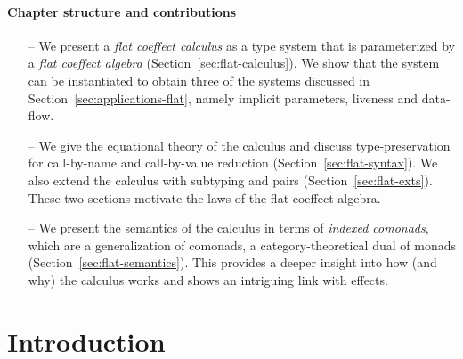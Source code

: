\paragraph{Chapter structure and contributions}
\begin{itemize}
\item[--] We present a \emph{flat coeffect calculus} as a type system that is parameterized by a 
  \emph{flat coeffect algebra} (Section~\ref{sec:flat-calculus}). We show that the system can be 
  instantiated to obtain three of the systems discussed in Section~\ref{sec:applications-flat},
  namely implicit parameters, liveness and data-flow.
  
\item[--] We give the equational theory of the calculus and discuss type-pre\-ser\-vation for call-by-name
  and call-by-value reduction (Section~\ref{sec:flat-syntax}). We also extend the calculus
  with subtyping and pairs (Section~\ref{sec:flat-exts}). These two sections motivate the laws
  of the flat coeffect algebra.
  
\item[--] We present the semantics of the calculus in terms of \emph{indexed comonads}, which are a
  generalization of comonads, a category-theoretical dual of monads (Section~\ref{sec:flat-semantics}).
  This provides a deeper insight into how (and why) the calculus works and shows an 
  intriguing link with effects.
\end{itemize}

%                                                                                      
%                                                                                     

\section{Introduction}
\label{sec:flat-intro}

